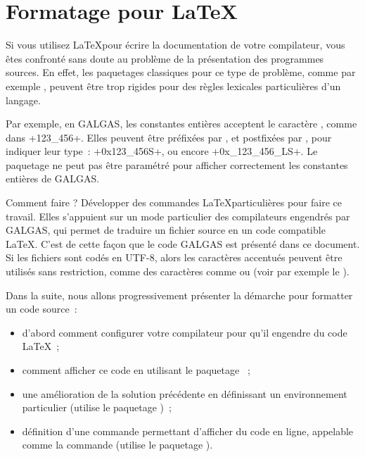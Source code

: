 
\chapter{Formatage pour LaTeX}



Si vous utilisez \LaTeX pour écrire la documentation de votre compilateur, vous êtes confronté sans doute au problème de la présentation des programmes sources. En effet, les paquetages classiques pour ce type de problème, comme par exemple , peuvent être trop rigides pour des règles lexicales particulières d'un langage.

Par exemple, en GALGAS, les constantes entières acceptent le caractère \tpp{\_}, comme dans \ggsq+123_456+. Elles peuvent être préfixées par , et postfixées par ,  pour indiquer leur type~: \ggsq+0x123_456S+, ou encore \ggsq+0x_123_456_LS+. Le paquetage  ne peut pas être paramétré pour afficher correctement les constantes entières de GALGAS.

Comment faire ? Développer des commandes \LaTeX particulières pour faire ce travail. Elles s'appuient sur un mode particulier des compilateurs engendrés par GALGAS, qui permet de traduire un fichier source en un code compatible \LaTeX. C'est de cette façon que le code GALGAS est présenté dans ce document. Si les fichiers  sont codés en UTF-8, alors les caractères accentués peuvent être utilisés sans restriction, comme des caractères comme  ou  (voir par exemple le ).

Dans la suite, nous allons progressivement présenter la démarche pour formatter un code source~:
\begin{itemize}
  \item d'abord comment configurer votre compilateur pour qu'il engendre du code \LaTeX~;
  \item comment afficher ce code en utilisant le paquetage ~;
  \item une amélioration de la solution précédente en définissant un environnement particulier (utilise le paquetage )~;
  \item définition d'une commande permettant d'afficher du code en ligne, appelable comme la commande  (utilise le paquetage ).
\end{itemize}

